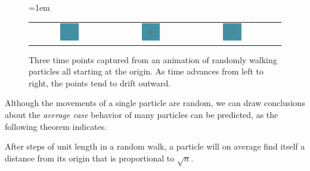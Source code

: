 \begin{figure}[h]
\centering
\mySfFamily
\tabcolsep=1em
\begin{tabular}{c c c c}
\includegraphics[width=0.25\textwidth]{../images/random_walk_particles_1} & \includegraphics[width=0.25\textwidth]{../images/random_walk_particles_2} & \includegraphics[width=0.25\textwidth]{../images/random_walk_particles_4}\\
\end{tabular}
\caption{Three time points captured from an animation of randomly walking particles all starting at the origin. As time advances from left to right, the points tend to drift outward.}
\label{fig:random_walk_multiple_particles}
\end{figure}

Although the movements of a single particle are random, we can draw conclusions about the \textit{average case} behavior of many particles can be predicted, as the following theorem indicates.

\begin{namedtheorem}
After  steps of unit length in a random walk, a particle will on average find itself a distance from its origin that is proportional to $\sqrt{n}$.
\end{namedtheorem}

\fudgespace

\begin{note}\end{note}

